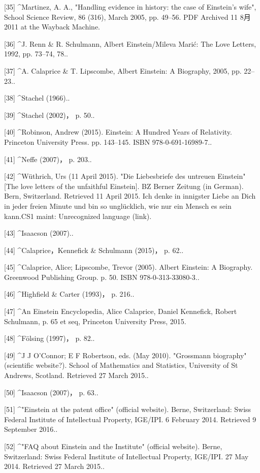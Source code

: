 [35]
^Martinez, A. A., "Handling evidence in history: the case of Einstein's wife", School Science Review, 86 (316), March 2005, pp. 49–56. PDF Archived 11 8月 2011 at the Wayback Machine.

[36]
^J. Renn & R. Schulmann, Albert Einstein/Mileva Marić: The Love Letters, 1992, pp. 73–74, 78..

[37]
^A. Calaprice & T. Lipscombe, Albert Einstein: A Biography, 2005, pp. 22–23..

[38]
^Stachel (1966)..

[39]
^Stachel (2002)， p. 50..

[40]
^Robinson, Andrew (2015). Einstein: A Hundred Years of Relativity. Princeton University Press. pp. 143–145. ISBN 978-0-691-16989-7..

[41]
^Neffe (2007)， p. 203..

[42]
^Wüthrich, Urs (11 April 2015). "Die Liebesbriefe des untreuen Einstein" [The love letters of the unfaithful Einstein]. BZ Berner Zeitung (in German). Bern, Switzerland. Retrieved 11 April 2015. Ich denke in innigster Liebe an Dich in jeder freien Minute und bin so unglücklich, wie nur ein Mensch es sein kann.CS1 maint: Unrecognized language (link).

[43]
^Isaacson (2007)..

[44]
^Calaprice，Kennefick & Schulmann (2015)， p. 62..

[45]
^Calaprice, Alice; Lipscombe, Trevor (2005). Albert Einstein: A Biography. Greenwood Publishing Group. p. 50. ISBN 978-0-313-33080-3..

[46]
^Highfield & Carter (1993)， p. 216..

[47]
^An Einstein Encyclopedia, Alice Calaprice, Daniel Kennefick, Robert Schulmann, p. 65 et seq, Princeton University Press, 2015.

[48]
^Fölsing (1997)， p. 82..

[49]
^J J O'Connor; E F Robertson, eds. (May 2010). "Grossmann biography" (scientific website?). School of Mathematics and Statistics, University of St Andrews, Scotland. Retrieved 27 March 2015..

[50]
^Isaacson (2007)， p. 63..

[51]
^"Einstein at the patent office" (official website). Berne, Switzerland: Swiss Federal Institute of Intellectual Property, IGE/IPI. 6 February 2014. Retrieved 9 September 2016..

[52]
^"FAQ about Einstein and the Institute" (official website). Berne, Switzerland: Swiss Federal Institute of Intellectual Property, IGE/IPI. 27 May 2014. Retrieved 27 March 2015..

